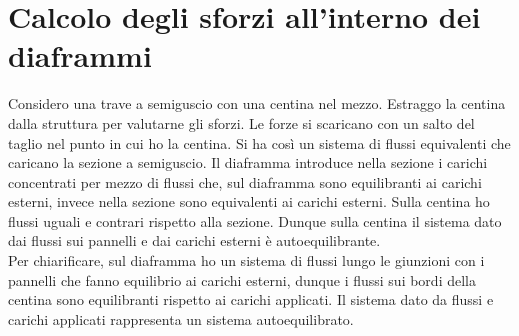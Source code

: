 \section{Calcolo degli sforzi all'interno dei diaframmi}

Considero una trave a semiguscio con una centina nel mezzo. Estraggo la centina dalla struttura per valutarne gli sforzi. Le forze si scaricano con un salto del taglio nel punto in cui ho la centina. Si ha così un sistema di flussi equivalenti che caricano la sezione a semiguscio. Il diaframma introduce nella sezione i carichi concentrati per mezzo di flussi che, sul diaframma sono equilibranti ai carichi esterni, invece nella sezione sono equivalenti ai carichi esterni. Sulla centina ho flussi uguali e contrari rispetto alla sezione. Dunque sulla centina il sistema dato dai flussi sui pannelli e dai carichi esterni è autoequilibrante.\\


Per chiarificare, sul diaframma ho un sistema di flussi lungo le giunzioni con i pannelli che fanno equilibrio ai carichi esterni, dunque i flussi sui bordi della centina sono equilibranti rispetto ai carichi applicati. Il sistema dato da flussi e carichi applicati rappresenta un sistema autoequilibrato.\\


